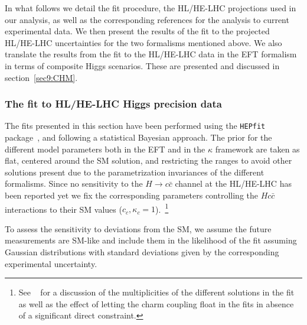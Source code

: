 In what follows we detail the fit procedure, the HL/HE-LHC projections used in our analysis, as well as the corresponding references for the analysis to current experimental data. We then present the results of the fit to the projected HL/HE-LHC uncertainties for the two formalisms mentioned above. We also translate the results from the fit to the HL/HE-LHC data in the EFT formalism in terms of composite Higgs scenarios. These are presented and discussed in section~\ref{sec9:CHM}.
\subsubsection{The fit to HL/HE-LHC Higgs precision data}

The fits presented in this section have been performed using the {\tt HEPfit} package~\cite{hepfit,hepfitsite}, and following a statistical Bayesian approach. The prior for the different model parameters both in the EFT and in the $\kappa$ framework are taken as flat, centered around the SM solution, and restricting the ranges to avoid other solutions present due to the parametrization invariances of the different formalisms.
Since no sensitivity to the $H\to c\bar{c}$ channel at the HL/HE-LHC has been reported yet we fix the corresponding parameters controlling the $Hc\bar c$ interactions to their SM values ($c_c,\kappa_c=1$).~\footnote{See ~\cite{deBlas:2018tjm} for a discussion of the multiplicities of the different solutions in the fit as well as the effect of letting the charm coupling float in the fits in absence of a significant direct constraint.}

To assess the sensitivity to deviations from the SM, we assume the future measurements are SM-like and include them in the likelihood of the fit assuming Gaussian distributions with standard deviations given by the corresponding experimental uncertainty. 

